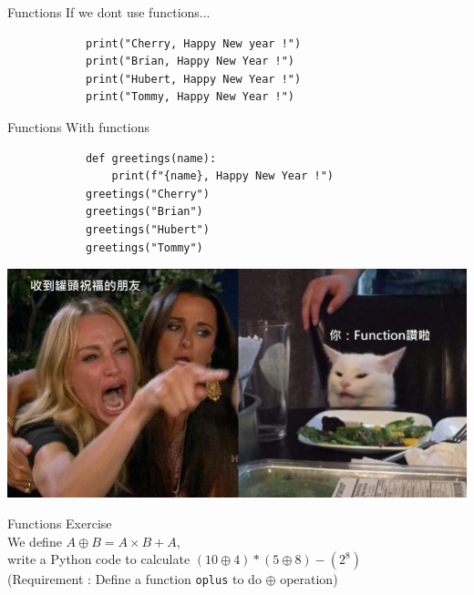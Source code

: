 \documentclass{beamer}
\begin{document}
    \begin{frame}[fragile]{Functions}
        \color{blue} \Large If we dont use functions... \\
        \color{black} \normalsize \vskip 5pt
        \begin{verbatim}
            print("Cherry, Happy New year !")
            print("Brian, Happy New Year !")
            print("Hubert, Happy New Year !")
            print("Tommy, Happy New Year !")
        \end{verbatim}
    \end{frame}

    \begin{frame}[fragile]{Functions}
        \color{blue} \Large With functions\\
        \color{black} \normalsize \vskip 5pt
        \begin{verbatim}
            def greetings(name):
                print(f"{name}, Happy New Year !")
            greetings("Cherry")
            greetings("Brian")
            greetings("Hubert")
            greetings("Tommy")
        \end{verbatim}
    \end{frame}

    \begin{frame}
        \begin{center}
            \includegraphics[scale=0.3]{Cat_and_women.jpg}
        \end{center}
    \end{frame}
    
    \begin{frame}{Functions}
        \color{blue} \Large Exercise \\
        \color{black} \normalsize \vskip 5pt
        We define $A \oplus B = A \times B + A$, \\
        write a Python code to calculate $ (10 \oplus 4) * (5 \oplus 8) - (2^8) $ \\
        (Requirement : Define a function \texttt{oplus} to do $\oplus$ operation)
    \end{frame}
    
\end{document}
